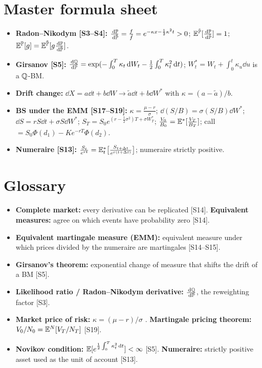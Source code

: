 \documentclass[10pt]{article}
\begin{document}
\section{Master formula sheet}
\begin{itemize}
\item \textbf{Radon--Nikodym [S3--S4]:} $\frac{\,\mathrm{d}\mathbb{P}}{\,\mathrm{d}\tilde{\mathbb{P}}}=\frac{f}{\tilde f}=e^{-\kappa x-\frac12\kappa^2t}>0$; $\mathbb{E}^{\tilde{\mathbb{P}}}[\frac{\,\mathrm{d}\mathbb{P}}{\,\mathrm{d}\tilde{\mathbb{P}}}]=1$; $\mathbb{E}^{\mathbb{P}}[g]=\mathbb{E}^{\tilde{\mathbb{P}}}[g\frac{\,\mathrm{d}\mathbb{P}}{\,\mathrm{d}\tilde{\mathbb{P}}}]$.
\item \textbf{Girsanov [S5]:} $\frac{\,\mathrm{d}\mathbb{Q}}{\,\mathrm{d}\mathbb{P}}=\exp(-\int_0^T\kappa_t\,\mathrm{d} W_t-\frac12\int_0^T\kappa_t^2\,\mathrm{d} t)$; $W^*_t=W_t+\int_0^t\kappa_u\dd u$ is a $\mathbb{Q}$-BM.
\item \textbf{Drift change:} $\dd X=a\dd t+b\dd W\to\tilde a\dd t+b\dd W^*$ with $\kappa=(a-\tilde a)/b$.
\item \textbf{BS under the EMM [S17--S19]:} $\kappa=\frac{\mu-r}{\sigma}$; $\dd(S/B)=\sigma(S/B)\dd W^*$; $\dd S=rS\dd t+\sigma S\dd W^*$; $S_T=S_0e^{(r-\frac12\sigma^2)T+\sigma W^*_T}$; $\frac{V_0}{B_0}=\mathbb{E}^*[\frac{V_T}{B_T}]$; call $=S_0\Phi(d_1)-Ke^{-rT}\Phi(d_2)$.
\item \textbf{Numeraire [S13]:} $\frac{S_t}{e^{rt}}=\mathbb{E}^*_t\big[\frac{S_{t+\Delta t}}{e^{r(t+\Delta t)}}\big]$; numeraire strictly positive.
\end{itemize}

\section{Glossary}
\begin{itemize}
\item \textbf{Complete market:} every derivative can be replicated [S14]. \quad \textbf{Equivalent measures:} agree on which events have probability zero [S14].
\item \textbf{Equivalent martingale measure (EMM):} equivalent measure under which prices divided by the numeraire are martingales [S14--S15].
\item \textbf{Girsanov's theorem:} exponential change of measure that shifts the drift of a BM [S5].
\item \textbf{Likelihood ratio / Radon--Nikodym derivative:} $\frac{\,\mathrm{d}\mathbb{Q}}{\,\mathrm{d}\mathbb{P}}$, the reweighting factor [S3].
\item \textbf{Market price of risk:} $\kappa=(\mu-r)/\sigma$ \beyond. \quad \textbf{Martingale pricing theorem:} $V_0/N_0=\mathbb{E}^N[V_T/N_T]$ [S19].
\item \textbf{Novikov condition:} $\mathbb{E}[e^{\frac12\int_0^T\kappa_t^2\,\mathrm{d} t}]<\infty$ [S5]. \quad \textbf{Numeraire:} strictly positive asset used as the unit of account [S13].
\end{itemize}
\end{document}
